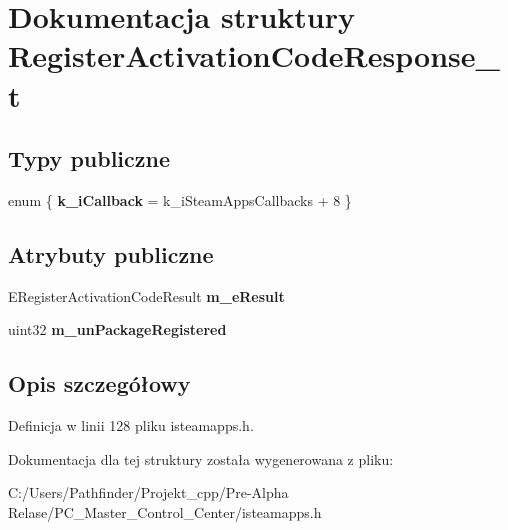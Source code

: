 \hypertarget{struct_register_activation_code_response__t}{}\section{Dokumentacja struktury Register\+Activation\+Code\+Response\+\_\+t}
\label{struct_register_activation_code_response__t}
\subsection*{Typy publiczne}
\begin{DoxyCompactItemize}
\item 
\mbox{\label{struct_register_activation_code_response__t_a3c08aa5f3eb9917f94743482c310f6aa}} 
enum \{ {\bfseries k\+\_\+i\+Callback} = k\+\_\+i\+Steam\+Apps\+Callbacks + 8
 \}
\end{DoxyCompactItemize}
\subsection*{Atrybuty publiczne}
\begin{DoxyCompactItemize}
\item 
\mbox{\label{struct_register_activation_code_response__t_a9f94348fd421e0f5bfbff9a46432e1aa}} 
E\+Register\+Activation\+Code\+Result {\bfseries m\+\_\+e\+Result}
\item 
\mbox{\label{struct_register_activation_code_response__t_af7cb64c43cd2463403e507a7edc74b6d}} 
uint32 {\bfseries m\+\_\+un\+Package\+Registered}
\end{DoxyCompactItemize}


\subsection{Opis szczegółowy}


Definicja w linii 128 pliku isteamapps.\+h.



Dokumentacja dla tej struktury została wygenerowana z pliku\+:\begin{DoxyCompactItemize}
\item 
C\+:/\+Users/\+Pathfinder/\+Projekt\+\_\+cpp/\+Pre-\/\+Alpha Relase/\+P\+C\+\_\+\+Master\+\_\+\+Control\+\_\+\+Center/isteamapps.\+h\end{DoxyCompactItemize}
